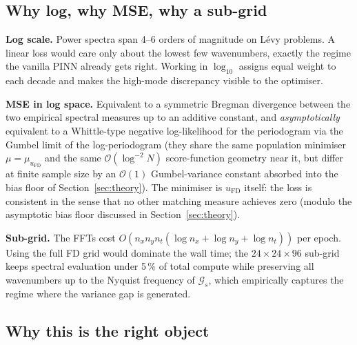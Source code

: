 \documentclass[review,12pt]{elsarticle}
\begin{document}
\subsection{Why log, why MSE, why a sub-grid}

\textbf{Log scale.} Power spectra span 4--6 orders of magnitude on
L\'evy problems. A linear loss would care only about the lowest few
wavenumbers, exactly the regime the vanilla PINN already gets
right. Working in \(\log_{10}\) assigns equal weight to each decade
and makes the high-mode discrepancy visible to the optimiser.

\textbf{MSE in log space.} Equivalent to a symmetric Bregman
divergence between the two empirical spectral measures up to an
additive constant, and \emph{asymptotically} equivalent to a
Whittle-type negative log-likelihood for the periodogram via the
Gumbel limit of the log-periodogram
\cite{Whittle1953,Dahlhaus1996,Brillinger1981} (they share the same
population minimiser \(\mu = \mu_{u_{\mathrm{FD}}}\) and the same
\(\mathcal O(\log^{-2} N)\) score-function geometry near it, but
differ at finite sample size by an \(\mathcal O(1)\) Gumbel-variance
constant absorbed into the bias floor of
Section~\ref{sec:theory}).
The minimiser is \(u_{\mathrm{FD}}\) itself: the loss is consistent
in the sense that no other matching measure achieves zero (modulo
the asymptotic bias floor discussed in Section~\ref{sec:theory}).

\textbf{Sub-grid.} The FFTs cost
\(O(n_x n_y n_t (\log n_x + \log n_y + \log n_t))\) per epoch.
Using the full FD grid would dominate the wall time; the
\(24 \times 24 \times 96\) sub-grid keeps spectral evaluation under
5\,\% of total compute while preserving all wavenumbers up to the
Nyquist frequency of \(\mathcal{G}_s\), which empirically captures
the regime where the variance gap is generated.

\subsection{Why this is the right object}
\label{subsec:right-object}
\end{document}
